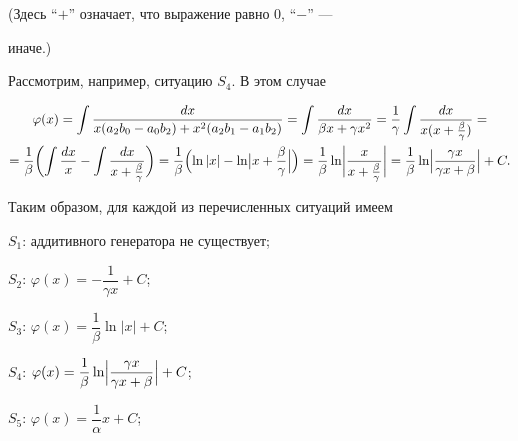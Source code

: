 \medskip





\noindent (Здесь ``$+$'' означает, что выражение равно 0, ``$-$'' ---


иначе.)





Рассмотрим, например, ситуацию $S_4$. В этом случае


\begin{multline*}


\varphi(x)=\int\frac{dx}


{x(a_2b_0-a_0b_2)+x^2(a_2b_1-a_1b_2)}=


\int\frac{dx}{\beta x+\gamma x^2} =\frac{1}{\gamma}\int


\frac{dx}{x(x+\frac{\beta}{\gamma})}=\\


=\frac{1}{\beta}\biggl(\int\frac{dx}{x}-\int


\frac{dx}{x+\frac{\beta}{\gamma}}\biggr)=\frac{1}{\beta}


\Bigl(\ln|x|-\ln\bigl|x+\frac{\beta}{\gamma}\Bigr|\Bigr)=


\frac{1}{\beta}\ln\biggl|\frac{x}{x+\frac{\beta}{\gamma}}\biggr|=


\frac{1}{\beta}\ln\Bigl|\frac{\gamma x}{\gamma x+\beta}\Bigr|+C.


\end{multline*}





Таким образом, для каждой из перечисленных ситуаций имеем





$S_1$: аддитивного генератора не существует;





$S_2$: $\varphi(x)=-\dfrac{1}{\gamma x}+C$;





$S_3$: $\varphi(x)=\dfrac{1}{\beta}\ln|x|+C$;





$S_4$: $\varphi(x)=\dfrac{1}{\beta}\ln\Bigl|


\dfrac{\gamma x}{\gamma x+\beta}\Bigr|+C$;





$S_5$: $\varphi(x)=\dfrac{1}{\alpha}x+C$;





